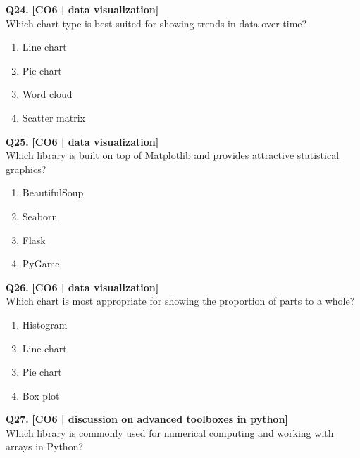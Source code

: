 \noindent\textbf{Q24.} \hfill {\small\color{LPUOrange}\textbf{[CO6 | data visualization]}}\\[2pt]
Which chart type is best suited for showing trends in data over time?

\begin{enumerate}[label=(\alph*),topsep=2pt,itemsep=1pt,partopsep=0pt,parsep=0pt]
    \item \relax Line chart
    \item \relax Pie chart
    \item \relax Word cloud
    \item \relax Scatter matrix
\end{enumerate}
\vspace{{2mm}}

\noindent\textbf{Q25.} \hfill {\small\color{LPUOrange}\textbf{[CO6 | data visualization]}}\\[2pt]
Which library is built on top of Matplotlib and provides attractive statistical graphics?

\begin{enumerate}[label=(\alph*),topsep=2pt,itemsep=1pt,partopsep=0pt,parsep=0pt]
    \item \relax BeautifulSoup
    \item \relax Seaborn
    \item \relax Flask
    \item \relax PyGame
\end{enumerate}
\vspace{{2mm}}

\noindent\textbf{Q26.} \hfill {\small\color{LPUOrange}\textbf{[CO6 | data visualization]}}\\[2pt]
Which chart is most appropriate for showing the proportion of parts to a whole?

\begin{enumerate}[label=(\alph*),topsep=2pt,itemsep=1pt,partopsep=0pt,parsep=0pt]
    \item \relax Histogram
    \item \relax Line chart
    \item \relax Pie chart
    \item \relax Box plot
\end{enumerate}
\vspace{{2mm}}

\noindent\textbf{Q27.} \hfill {\small\color{LPUOrange}\textbf{[CO6 | discussion on advanced toolboxes in python]}}\\[2pt]
Which library is commonly used for numerical computing and working with arrays in Python?

